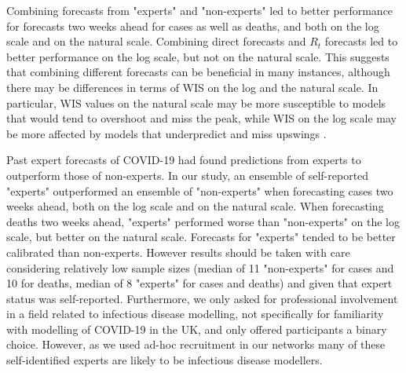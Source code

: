 \documentclass[10pt,a4paper,twocolumn]{article}
\begin{document}
Combining forecasts from "experts" and "non-experts" led to better performance for forecasts two weeks ahead for cases as well as deaths, and both on the log scale and on the natural scale. Combining direct forecasts and $R_t$ forecasts led to better performance on the log scale, but not on the natural scale. This suggests that combining different forecasts can be beneficial in many instances, although there may be differences in terms of WIS on the log and the natural scale. In particular, WIS values on the natural scale may be more susceptible to models that would tend to overshoot and miss the peak, while WIS on the log scale may be more affected by models that underpredict and miss upswings \citep{bosseTransformationForecastsEvaluating2023}. 


Past expert forecasts of COVID-19 \cite{recchiaHowWellDid2021} had found predictions from experts to outperform those of non-experts. In our study, an ensemble of self-reported "experts" outperformed an ensemble of "non-experts" when forecasting cases two weeks ahead, both on the log scale and on the natural scale. When forecasting deaths two weeks ahead, "experts" performed worse than "non-experts" on the log scale, but better on the natural scale. Forecasts for "experts" tended to be better calibrated than non-experts.  However results should be taken with care considering relatively low sample sizes (median of 11 "non-experts" for cases and 10 for deaths, median of 8 "experts" for cases and deaths) and given that expert status was self-reported. Furthermore, we only asked for professional involvement in a field related to infectious disease modelling, not specifically for familiarity with modelling of COVID-19 in the UK, and only offered participants a binary choice. However, as we used ad-hoc recruitment in our networks many of these self-identified experts are likely to be infectious disease modellers.
\end{document}
